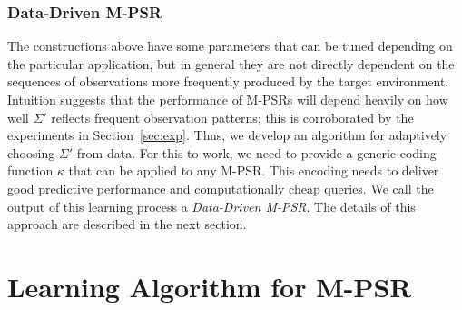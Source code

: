\documentclass[letterpaper]{article}
\begin{document}
%

\subsubsection{Data-Driven M-PSR}


The constructions above have some parameters that can be tuned depending on the particular application, but in general they are not directly dependent on the sequences of observations more frequently produced by the target environment. Intuition suggests that the performance of M-PSRs will depend heavily on how well $\Sigma'$ reflects frequent observation patterns; this is corroborated by the experiments in Section~\ref{sec:exp}. Thus, we develop an algorithm for adaptively choosing $\Sigma'$ from data. For this to work, we need to provide a generic coding function $\kappa$ that can be applied to any M-PSR. This encoding needs to deliver good predictive performance and computationally cheap queries. We call the output of this learning process a \emph{Data-Driven M-PSR}. The details of this approach are described in the next section.


\section{Learning Algorithm for M-PSR}
\end{document}
